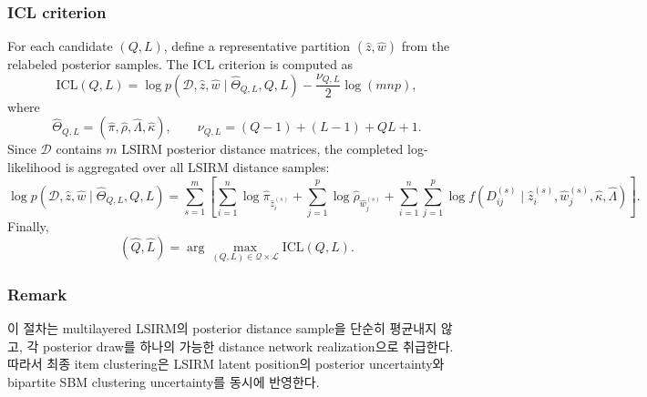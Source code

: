 \documentclass[A4paper,11pt]{article}
\begin{document}
\subsubsection{ICL criterion}

For each candidate $(Q,L)$, define a representative partition
$(\widehat z,\widehat w)$ from the relabeled posterior samples.
The ICL criterion is computed as
\[
\mathrm{ICL}(Q,L)
=
\log p(\mathcal{D},\widehat z,\widehat w \mid \widehat\Theta_{Q,L},Q,L)
-
\frac{\nu_{Q,L}}{2}\log(mnp),
\]
where
\[
\widehat\Theta_{Q,L}
=
(\widehat\pi,\widehat\rho,\widehat\Lambda,\widehat\kappa),
\qquad
\nu_{Q,L}
=
(Q-1)+(L-1)+QL+1.
\]
Since $\mathcal{D}$ contains $m$ LSIRM posterior distance matrices, the completed log-likelihood is aggregated over
all LSIRM distance samples:
\[
\log p(\mathcal{D},\widehat z,\widehat w \mid \widehat\Theta_{Q,L},Q,L)
=
\sum_{s=1}^m
\left[
\sum_{i=1}^n \log \widehat\pi_{\widehat z_i^{(s)}}
+
\sum_{j=1}^p \log \widehat\rho_{\widehat w_j^{(s)}}
+
\sum_{i=1}^n
\sum_{j=1}^p
\log f\left(
D^{(s)}_{ij}
\mid
\widehat z_i^{(s)},\widehat w_j^{(s)},\widehat\kappa,\widehat\Lambda
\right)
\right].
\]
Finally,
\[
(\widehat Q,\widehat L)
=
\arg\max_{(Q,L)\in\mathcal{Q}\times\mathcal{L}}
\mathrm{ICL}(Q,L).
\]

\subsubsection{Remark}

이 절차는 multilayered LSIRM의 posterior distance sample을 단순히 평균내지 않고,
각 posterior draw를 하나의 가능한 distance network realization으로 취급한다.
따라서 최종 item clustering은 LSIRM latent position의 posterior uncertainty와
bipartite SBM clustering uncertainty를 동시에 반영한다.
\end{document}
